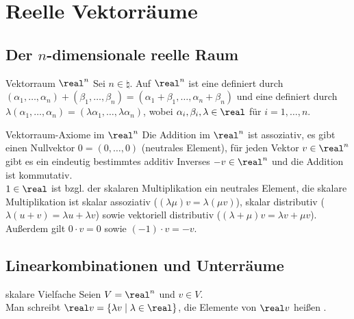 \chapter{%
    Reelle Vektorräume%
}

\section{%
    \texorpdfstring{Der $n$-dimensionale reelle Raum}%
    {Der n-dimensionale reelle Raum}%
}

\begin{Def}{Vektorraum $\real^n$}
    Sei $n \in \natural$.
    Auf $\real^n$ ist eine  definiert durch \\
    $(\alpha_1, \ldots, \alpha_n) + (\beta_1, \ldots, \beta_n)
    = (\alpha_1 + \beta_1, \ldots, \alpha_n + \beta_n)$ und eine
     definiert durch
    $\lambda (\alpha_1, \ldots, \alpha_n) =
    (\lambda \alpha_1, \ldots, \lambda \alpha_n)$,
    wobei $\alpha_i, \beta_i, \lambda \in \real$ für $i = 1, \ldots, n$.
\end{Def}

\begin{Satz}{Vektorraum-Axiome im $\real^n$}
    Die Addition im $\real^n$ ist assoziativ, es gibt einen Nullvektor
    $0 = (0, \ldots, 0)$ (neutrales Element), für jeden Vektor $v \in \real^n$
    gibt es ein eindeutig bestimmtes additiv Inverses $-v \in \real^n$
    und die Addition ist kommutativ. \\
    $1 \in \real$ ist bzgl. der skalaren Multiplikation ein neutrales Element,
    die skalare Multiplikation ist skalar assoziativ
    ($(\lambda \mu) v = \lambda (\mu v)$),
    skalar distributiv ($\lambda (u + v) = \lambda u + \lambda v$) sowie
    vektoriell distributiv ($(\lambda + \mu) v = \lambda v + \mu v$). \qquad
    Außerdem gilt $0 \cdot v = 0$ sowie $(-1) \cdot v = -v$.
\end{Satz}

\section{%
    Linearkombinationen und Unterräume%
}

\begin{Def}{skalare Vielfache}
    Seien $V = \real^n$ und $v \in V$. \\
    Man schreibt $\real v = \{\lambda v \;|\; \lambda \in \real\}$,
    die Elemente von $\real v$ heißen .
\end{Def}

